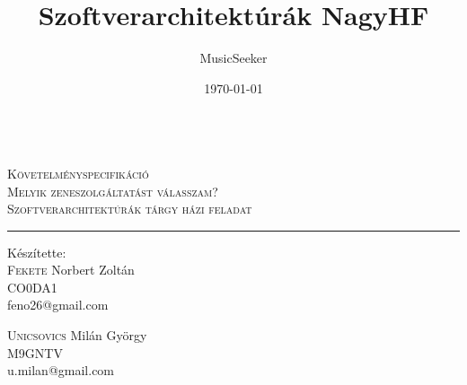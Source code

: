 \documentclass[a4paper,12pt]{article}
\author{MusicSeeker}
\title{Szoftverarchitektúrák NagyHF}
\date{\today}
\begin{document}
\begin{titlepage}
\begin{center}
\vspace*{\fill}
\hrulefill\\[0.5cm]
  \textsc{\LARGE Követelményspecifikáció}\\[0.5cm] 
  \textsc{\Large Melyik zeneszolgáltatást válasszam? }\\[0.2cm]
  \textsc{\large Szoftverarchitektúrák tárgy házi feladat}\\[0.5cm]
\hrule
 \end{center}
 \vspace{3cm}
\begin{minipage}{0.4\textwidth}
\begin{flushleft} \large
Készítette:\\[0.2cm]
\textsc{Fekete} Norbert Zoltán\\[0.2cm]
CO0DA1\\
feno26@gmail.com
\end{flushleft}
\end{minipage}
\begin{minipage}{0.6\textwidth}
\begin{flushleft} \large
\vspace{0.82cm}
\textsc{Unicsovics} Milán György\\[0.2cm]
M9GNTV\\
u.milan@gmail.com
\end{flushleft}
\end{minipage}
\vspace*{\fill}
\end{titlepage}


\end{document}

